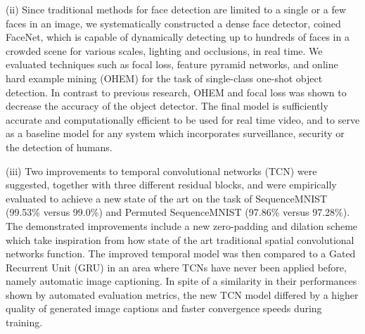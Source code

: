 \documentclass[a4paper, twoside]{article}
\begin{document}
(ii) Since traditional methods for face detection are limited to a single or a few faces in an image, we systematically constructed a dense face detector, coined FaceNet, which is capable of dynamically detecting up to hundreds of faces in a crowded scene for various scales, lighting and occlusions, in real time. We evaluated techniques such as focal loss, feature pyramid networks, and online hard example mining (OHEM) for the task of single-class one-shot object detection. In contrast to previous research, OHEM and focal loss was shown to decrease the accuracy of the object detector. The final model is sufficiently accurate and computationally efficient to be used for real time video, and to serve as a baseline model for any system which incorporates surveillance, security or the detection of humans.

(iii) Two improvements to temporal convolutional networks (TCN) were suggested, together with three different residual blocks, and were empirically evaluated to achieve a new state of the art on the task of SequenceMNIST (99.53\% versus 99.0\%) and Permuted SequenceMNIST (97.86\% versus 97.28\%). The demonstrated improvements include a new zero-padding and dilation scheme which take inspiration from how state of the art traditional spatial convolutional networks function. The improved temporal model was then compared to a Gated Recurrent Unit (GRU) in an area where TCNs have never been applied before, namely automatic image captioning. In spite of a similarity in their performances shown by automated evaluation metrics, the new TCN model differed by a higher quality of generated image captions and faster convergence speeds during training.
\end{document}
